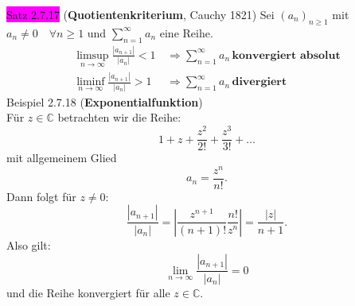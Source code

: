 \documentclass[landscape, 10pt]{article}
\newcommand{\C}{\mathbb{C}}
\begin{document}
\begin{multicols}{3}
              \colorbox{magenta}{Satz 2.7.17} 
              (\textbf{Quotientenkriterium}, Cauchy 1821) 
                     Sei \textcolor{NavyBlue}{
                     $(a_n)_{n\geqslant1}$} mit 
                     \textcolor{NavyBlue}{
                     $a_n\neq0\quad\forall n\geqslant1$}
                     und \textcolor{NavyBlue}{
                     $\sum_{n=1}^\infty a_n$} eine Reihe.
                     \begin{align*}
                            \limsup\limits_{n\to\infty}
                            \frac{|a_{n+1}|}{|a_n|}<1 \,
                            &\Longrightarrow
                            \sum_{n=1}^\infty a_n \,
                            \textbf{konvergiert absolut} \\
                            \liminf\limits_{n\to\infty}
                            \frac{|a_{n+1}|}{|a_n|}>1 \,
                            &\Longrightarrow
                            \sum_{n=1}^\infty a_n \,
                            \textbf{divergiert}
                     \end{align*}
              \colorbox{Dandelion}{Beispiel 2.7.18} 
              (\textbf{Exponentialfunktion})\\
                     Für \textcolor{NavyBlue}{$z\in\C$}
                     betrachten wir die Reihe:
                     \begin{equation*}
                            1+z+\frac{z^2}{2!}+\frac{z^3}{3!}+\dots
                     \end{equation*}
                     mit allgemeinem Glied
                     \begin{equation*}
                            a_n=\frac{z^n}{n!}.
                     \end{equation*}
                     Dann folgt für \textcolor{NavyBlue}{$z\neq0$}:
                     \begin{equation*}
                            \frac{|a_{n+1}|}{|a_n|}
                            =|\frac{z^{n+1}}{(n+1)!}\frac{n!}{z^n}|
                            =\frac{|z|}{n+1}.
                     \end{equation*}
                     Also gilt:
                     \begin{equation*}
                            \lim\limits_{n\to\infty}\frac{|a_{n+1}|}{|a_n|}=0
                     \end{equation*}
                     und die Reihe konvergiert 
                     für alle \textcolor{NavyBlue}{$z\in\C$}.

\end{multicols}
\end{document}
